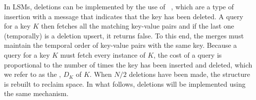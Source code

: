 In LSMs, deletions can be implemented by the use of ~\cite{DBLP:conf/hotstorage/EsmetBFK12,DBLP:conf/hotstorage/JannenBFJKP16},
which are a type of insertion with a message that indicates that the key has
been deleted. A query for a key $K$ then fetches all the matching key-value
pairs and if the last one (temporally) is a deletion upsert, it returns false.
To this end, the merges must maintain the temporal order of key-value pairs
with the same key. Because a query for a key $K$ must fetch every instance of
$K$, the cost of a query is proportional to the number of times the key has
been inserted and deleted, which we refer to as the ,
$D_K$ of $K$. When $N/2$ deletions have been made, the structure is rebuilt to
reclaim space. In what follows, deletions will be implemented using the same
mechanism.

